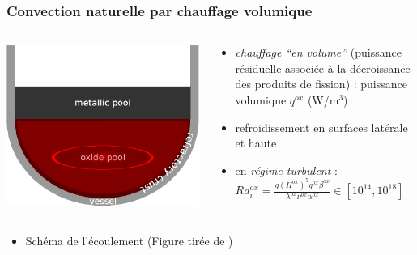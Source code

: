 \subsubsection{Convection naturelle par chauffage volumique}
\begin{frame}[fragile]
\begin{columns}[T]
    \begin{column}{0.25\textwidth}
\centering \includegraphics[height=0.3\textheight]{Figures/TD_2layer_oxide.eps}
    \end{column}
    \begin{column}{0.75\textwidth}
\begin{itemize}
    \item \emph{chauffage ``en volume''} (puissance résiduelle associée à la décroissance des produits de fission) : puissance volumique $q^{ox}$ (W/m$^3$)
    \item refroidissement en surfaces latérale et haute
    \item en \emph{régime turbulent} : $Ra_i^{ox}=\frac{g\left(H^{ox}\right)^5q^{ox}\beta^{ox}}{\lambda^{ox}\nu^{ox}\alpha^{ox}} \in [10^{14}, 10^{18}]$
    \end{itemize}
    \end{column}
\end{columns}
\begin{itemize}
\item Schéma de l'écoulement (Figure tirée de \cite{Bonnet1999})

\end{itemize}
\end{frame}
